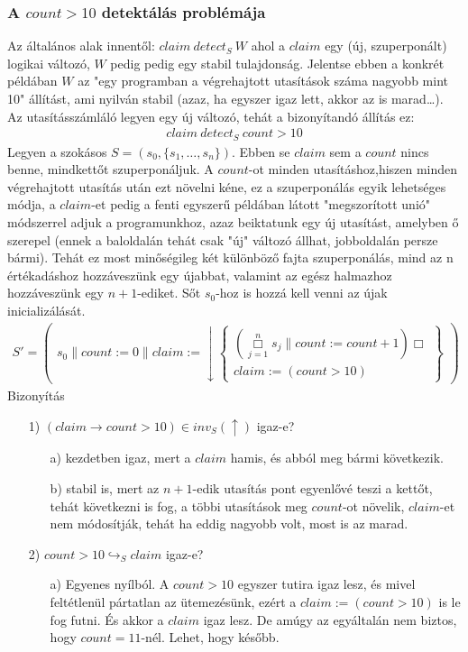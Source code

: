 \documentclass{article}
\newcommand{\false}{\downarrow}
\newcommand{\true}{\uparrow}
\newcommand{\pp}{\parallel}
\begin{document}
\subsubsection*{A $count>10$ detektálás problémája}
Az általános alak innentől: $claim\ detect_S\ W$ ahol a $claim$ egy (új, szuperponált) logikai változó, $W$ pedig pedig egy stabil tulajdonság. Jelentse ebben a konkrét példában $W$ az "egy programban a végrehajtott utasítások száma nagyobb mint 10" állítást, ami nyilván stabil (azaz, ha egyszer igaz lett, akkor az is marad\dots). Az utasításszámláló legyen egy új változó, tehát a bizonyítandó állítás ez:
\begin{align*}
claim\ detect_S\ count > 10
\end{align*}
Legyen a szokásos $S=(s_0,\lbrace s_1,\dots,s_n \rbrace)$. Ebben se $claim$ sem a $count$ nincs benne, mindkettőt szuperponáljuk. A $count$-ot minden utasításhoz,hiszen minden végrehajtott utasítás után ezt növelni kéne, ez a szuperponálás egyik lehetséges módja, a $claim$-et pedig a fenti egyszerű példában látott "megszorított unió" módszerrel adjuk a programunkhoz, azaz beiktatunk egy új utasítást, amelyben ő szerepel (ennek a baloldalán tehát csak "új" változó állhat, jobboldalán persze bármi).  Tehát ez most minőségileg két különböző fajta szuperponálás, mind az n értékadáshoz hozzáveszünk egy újabbat, valamint az egész halmazhoz hozzáveszünk egy $n+1$-ediket. Sőt $s_0$-hoz is hozzá kell venni az újak inicializálását.
\begin{align*}
S'=\left( \begin{array}{l}
s_0 \pp count:=0 \pp claim := \false
\left\{ \begin{array}{l}
(\overset{n}{\underset{j=1}{\Box}} s_j \pp count := count +1 ) \Box\\ claim := (count > 10)
\end{array}\right\}
\end{array}\right)
\end{align*}
Bizonyítás
\begin{enumerate}
\item[1)]$(claim \rightarrow count > 10) \in inv_S(\true)$ igaz-e?
\begin{enumerate}
\item[a)]kezdetben igaz, mert a $claim$ hamis, és abból meg bármi következik.\checkmark
\item[b)]stabil is, mert az $n+1$-edik utasítás pont egyenlővé teszi a kettőt, tehát következni is fog, a többi utasítások meg $count$-ot növelik, $claim$-et nem módosítják, tehát ha eddig nagyobb volt, most is az marad. \checkmark
\end{enumerate}
\item[2)]$count > 10 \hookrightarrow_S claim$ igaz-e?
\begin{enumerate}
\item[a)]Egyenes nyílból. A $count>10$ egyszer tutira igaz lesz, és mivel feltétlenül pártatlan az ütemezésünk, ezért a $claim := (count>10)$ is le fog futni. És akkor a $claim$ igaz lesz. De amúgy az egyáltalán nem biztos,
hogy $count = 11$-nél. Lehet, hogy később. \checkmark
\end{enumerate}
\end{enumerate}
\end{document}
